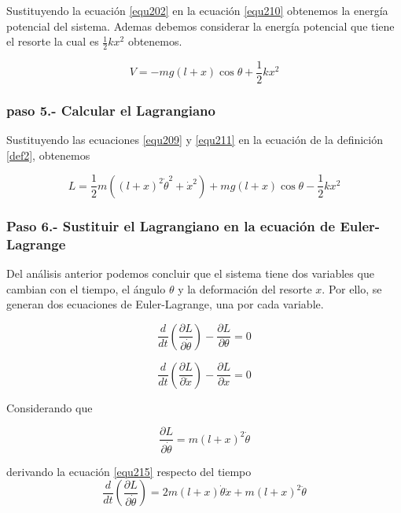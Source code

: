 \documentclass[12pt]{book}
\theoremstyle{definition}
\theoremstyle{remark}
\theoremstyle{plain}
\begin{document}
 Sustituyendo la ecuación \ref{equ202} en la ecuación \ref{equ210} obtenemos la energía potencial del sistema. Ademas debemos considerar la energía potencial que tiene el resorte la cual es $\frac{1}{2} k x^2$ obtenemos.

\begin{equation}
\label{equ211}
V = - m g (l+x) \cos \theta+\frac{1}{2} k x^2
\end{equation}

\subsubsection{paso 5.- Calcular el Lagrangiano}

Sustituyendo las ecuaciones \ref{equ209} y \ref{equ211} en la ecuación de la definición \ref{def2}, obtenemos

\begin{equation}
\label{equ212}
L =  \frac{1}{2}m (  (l+x)^2 \dot{\theta} ^2 + \dot{x} ^2 )+ m g (l+x) \cos \theta-\frac{1}{2} k x^2
\end{equation}

\subsubsection{Paso 6.- Sustituir el Lagrangiano en la ecuación de Euler-Lagrange}

Del análisis anterior podemos concluir que el sistema tiene dos variables que cambian con el tiempo, el ángulo $\theta$ y la deformación del resorte $x$. Por ello, se generan dos ecuaciones de Euler-Lagrange, una por cada variable.

\begin{equation}
\label{equ213}
\frac{d}{d t} \left ( \frac{\partial L}{\partial \dot {\theta}} \right )- \frac{\partial L}{\partial \theta} = 0
\end{equation}

\begin{equation}
\label{equ214}
\frac{d}{d t} \left ( \frac{\partial L}{\partial \dot {x}} \right )- \frac{\partial L}{\partial x} = 0
\end{equation}

Considerando que

\begin{equation}
\label{equ215}
\frac{\partial L}{\partial \dot{\theta}}=m (l+x)^2 \dot{\theta}
\end{equation}

derivando la ecuación \ref{equ215} respecto del tiempo
\begin{equation}
\label{equ216}
\frac{d}{d t} \left ( \frac{\partial L}{\partial \dot{\theta}} \right )=2 m (l+x) \dot{\theta} \dot{x} + m (l+x)^2 \ddot{\theta}
\end{equation}
\end{document}
